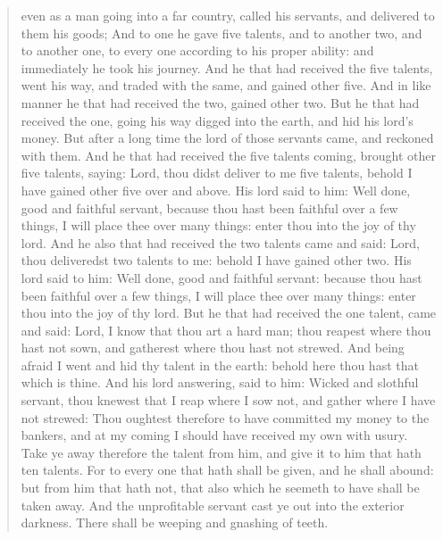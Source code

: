 \begin{terminalview}
\begin{quote}
	even as a man going into a far country, called his servants, and delivered to them his goods; And to one he gave five talents, and to another two, and to another one, to every one according to his proper ability: and immediately he took his journey. And he that had received the five talents, went his way, and traded with the same, and gained other five. And in like manner he that had received the two, gained other two. But he that had received the one, going his way digged into the earth, and hid his lord's money. But after a long time the lord of those servants came, and reckoned with them. And he that had received the five talents coming, brought other five talents, saying: Lord, thou didst deliver to me five talents, behold I have gained other five over and above. His lord said to him: Well done, good and faithful servant, because thou hast been faithful over a few things, I will place thee over many things: enter thou into the joy of thy lord. And he also that had received the two talents came and said: Lord, thou deliveredst two talents to me: behold I have gained other two. His lord said to him: Well done, good and faithful servant: because thou hast been faithful over a few things, I will place thee over many things: enter thou into the joy of thy lord. But he that had received the one talent, came and said: Lord, I know that thou art a hard man; thou reapest where thou hast not sown, and gatherest where thou hast not strewed. And being afraid I went and hid thy talent in the earth: behold here thou hast that which is thine. And his lord answering, said to him: Wicked and slothful servant, thou knewest that I reap where I sow not, and gather where I have not strewed: Thou oughtest therefore to have committed my money to the bankers, and at my coming I should have received my own with usury. Take ye away therefore the talent from him, and give it to him that hath ten talents. For to every one that hath shall be given, and he shall abound: but from him that hath not, that also which he seemeth to have shall be taken away. And the unprofitable servant cast ye out into the exterior darkness. There shall be weeping and gnashing of teeth.
\end{quote}
\end{terminalview}
\medskip

